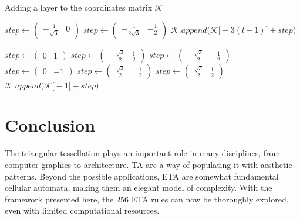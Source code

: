 \documentclass{article}
\begin{document}
\begin{algorithm}[H]
\caption{Adding a layer to the coordinates matrix $\mathcal{K}$}\label{expand-coords}
\begin{algorithmic}[1]
    \State $step \gets \begin{pmatrix}-\frac{1}{\sqrt{3}}&0\end{pmatrix} $
    \Else
    \State $step \gets \begin{pmatrix}-\frac{1}{2\sqrt{3}}&-\frac{1}{2}\end{pmatrix}$
    \EndIf
    \State $\mathcal{K}.append\Big(\mathcal{K}\big[-3(l-1)\big]+step\Big)$
        
            $step \gets \begin{pmatrix}0&1\end{pmatrix}$
            $step \gets \begin{pmatrix}-\frac{\sqrt{3}}{2}&\frac{1}{2}\end{pmatrix}$
            $step \gets \begin{pmatrix}-\frac{\sqrt{3}}{2}&-\frac{1}{2}\end{pmatrix}$
            $step \gets \begin{pmatrix}0&-1\end{pmatrix}$
            $step \gets \begin{pmatrix}\frac{\sqrt{3}}{2}&-\frac{1}{2}\end{pmatrix}$
            $step \gets \begin{pmatrix}\frac{\sqrt{3}}{2}&\frac{1}{2}\end{pmatrix}$
        \EndIf
        \State $\mathcal{K}.append\Big(\mathcal{K}\big[-1\big]+step\Big)$
    \EndFor
\end{algorithmic}
\end{algorithm}

\pagebreak
\section{Conclusion} \label{conclusion}
The triangular tessellation plays an important role in many disciplines, from computer graphics to architecture. TA are a way of populating it with aesthetic patterns. Beyond the possible applications, ETA are somewhat fundamental cellular automata, making them an elegant model of complexity. With the framework presented here, the 256 ETA rules can now be thoroughly explored, even with limited computational resources. \\
\end{document}
